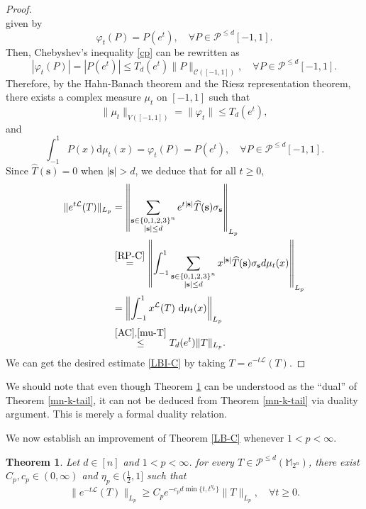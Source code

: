 \documentclass{amsbook}
\newtheorem{theorem}{Theorem}[chapter]
\theoremstyle{definition}
\theoremstyle{remark}
\numberwithin{section}{chapter}
\numberwithin{equation}{chapter}
\newcommand{\1}{\mathbf{1}}
\begin{document}
\begin{proof}
$$$$
given by
\begin{equation*}
\varphi_t(P)=P(e^t),\quad \forall P\in \mathcal{P}^{\leq d}[-1,1].
\end{equation*}
Then, Chebyshev's inequality \eqref{cp} can be rewritten as
\begin{equation*}\label{Var-I1}
|\varphi_{t}(P)| =|P(e^t)|\leq T_{d}(e^t)\|P\|_{\mathcal{C}([-1,1])}, \quad\forall P \in \mathcal{P}^{\leq d}[-1,1]. 
\end{equation*}
Therefore, by the Hahn-Banach theorem and the Riesz representation theorem, there exists a complex measure $\mu_{t}$ on $[-1,1]$ such that 
\begin{equation}\label{mu-T}
\|\mu_{t}\|_{V([-1,1])}=\|\varphi_t\| \leq T_{d}(e^{t}),
\end{equation}
and 
\begin{equation*}\label{RP-C}
\int_{-1}^{1} P(x) \mathrm{d} \mu_{t}(x)=\varphi_t(P)=P(e^{t}),\quad \forall P\in\mathcal{P}^{\leq d}[-1,1].
\end{equation*}
Since $\widehat{T}(\mathbf{s})=0$ when $|\mathbf{s}|>d$, we deduce that for all $t \geq 0$,
\begin{align*}
\|e^{t \mathcal{L}} (T)\|_{L_{p}}
&=\left\|\sum_{\substack{\mathbf{s}\in\{0,1,2,3\}^n\\|\mathbf{s}|\leq d}}e^{t |\mathbf{s}|}\widehat{T}(\mathbf{s}) \sigma_{\mathbf{s}}\right\|_{L_{p}}\\
&\stackrel{\eqref{RP-C}}{=}\left\|\int_{-1}^1\sum_{\substack{\mathbf{s}\in\{0,1,2,3\}^n\\ |\mathbf{s}|\leq d}}x^{|\mathbf{s}|}\widehat{T}(\mathbf{s}) \sigma_{\mathbf{s}}d\mu_t(x)\right\|_{L_{p}}\\
&=\left\|\int_{-1}^{1} x^{\mathcal{L}} (T) \mathrm{~d} \mu_{t}(x)\right\|_{L_{p}} \\
& \stackrel{\eqref{AC},\eqref{mu-T}}{\leq} T_{d}(e^{t})\|T\|_{L_{p}}.
\end{align*}
We can get the desired estimate \eqref{LBI-C} by taking $T=e^{-t\mathcal{L}}(T)$.
\end{proof}


We should note that even though Theorem \ref{MN-K-most-d} can be understood as the ``dual'' of Theorem \ref{mn-k-tail}, it can not be deduced from Theorem \ref{mn-k-tail} via duality argument. This is merely a formal duality relation.

We now establish an improvement  of Theorem \ref{LB-C} whenever $1<p<\infty$. 

\begin{theorem}\label{MN-K-most-d}
Let $ d \in [n]$ and $1<p<\infty$. for every  $T\in \mathcal{P}^{\leq d}(\mathbb{M}_{2^n})$, there exist $C_p,c_p\in(0,\infty)$ and $\eta_p\in(\frac{1}{2},1]$ such that
\begin{equation}\label{MN-K-most-d-Ineq}
\big\|e^{-t \mathcal{L}} (T)\big\|_{L_{p}} \geq C_p e^{-c_p d \min \{t, t^{\eta_p}\}}\|T\|_{L_{p}},\quad\forall t \geq 0.
\end{equation}
\end{theorem}
\end{document}
